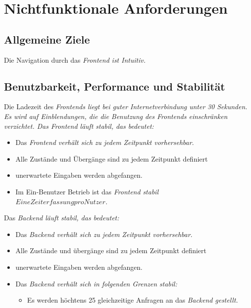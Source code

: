 \section{Nichtfunktionale Anforderungen}

\subsection{Allgemeine Ziele}
\begin{requirements}
     Die Navigation durch das \em Frontend \em  ist Intuitiv.
\end{requirements}

\subsection{Benutzbarkeit, Performance und Stabilität}
\begin{requirements}
     Die Ladezeit des \em Frontends \em  liegt bei guter Internetverbindung unter 30 Sekunden.
     Es wird auf Einblendungen, die die Benutzung des \em Frontends \em  einschränken verzichtet.
     Das \em Frontend \em  läuft stabil, das bedeutet:
     \begin{itemize}
        \item Das \em Frontend \em  verhält sich zu jedem Zeitpunkt vorhersehbar.
        \item Alle Zustände und Übergänge sind zu jedem Zeitpunkt definiert
        \item unerwartete Eingaben werden abgefangen.
        \item Im Ein-Benutzer Betrieb ist das \em Frontend \em  stabil \(Eine Zeiterfassung pro Nutzer\).
     \end{itemize}
      Das \em Backend \em  läuft stabil, das bedeutet:
          \begin{itemize}
             \item Das \em Backend \em  verhält sich zu jedem Zeitpunkt vorhersehbar.
             \item Alle Zustände und übergänge sind zu jedem Zeitpunkt definiert
             \item unerwartete Eingaben werden abgefangen.
             \item Das \em Backend \em  verhält sich in folgenden Grenzen stabil:
	         \begin{itemize}
                    \item Es werden höchtens 25 gleichzeitige Anfragen an das \em Backend \em  gestellt.
             \end{itemize}
          \end{itemize}
\end{requirements}

